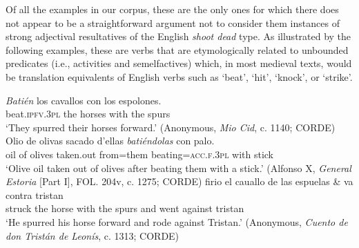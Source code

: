 \documentclass[output=paper,colorlinks,citecolor=brown,
]{langscibook}
\begin{document}

\noindent Of all the examples in our corpus, these are the only ones for which there does not appear to be a straightforward argument not to consider them instances of strong adjectival resultatives of the English \textit{shoot dead} type. As illustrated by the following examples, these are verbs that are etymologically related to unbounded predicates (i.e., activities and semelfactives) which, in most medieval texts, would be translation equivalents of English verbs such as 
`beat', `hit', `knock', or `strike'.

\ea
  \ea
    \gll \textit{Batién} los cavallos con los espolones.\\
beat.\textsc{ipfv}.\textsc{3pl} the horses with the spurs\\
    \glt `They spurred their horses forward.' (Anonymous, \textit{Mio Cid}, c. 1140; CORDE)
  \ex
    \gll Olio de olivas sacado d’ellas \textit{batiéndolas} con palo.\\
oil of olives taken.out	from=them beating=\textsc{acc}.\textsc{f}.\textsc{3pl} with stick\\
    \glt `Olive oil taken out of olives after beating them with a stick.'
(Alfonso X, \textit{General Estoria} [Part I], FOL. 204v, c. 1275; CORDE)
  \ex
    \gll firio el cauallo de las espuelas \& va contra tristan\\ 
struck the horse with the spurs and went against tristan \\
    \glt `He spurred his horse forward and rode against Tristan.' (Anonymous, \textit{Cuento de don Tristán de Leonís}, c. 1313; CORDE)
  \z 
\z 
\end{document}
